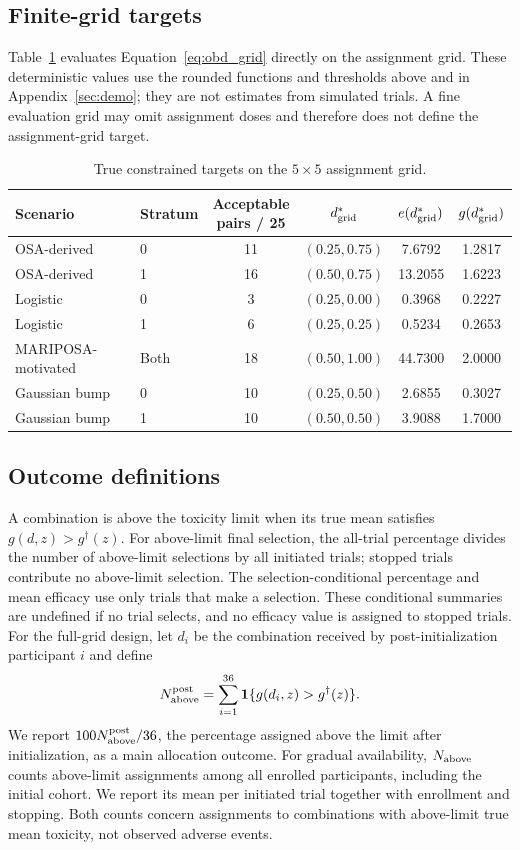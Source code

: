 \documentclass[11pt]{article}
\newcommand{\rev}[1]{{#1}}
\begin{document}
\subsection{Finite-grid targets}

Table~\ref{tab:grid_targets} evaluates Equation~\eqref{eq:obd_grid} directly on the assignment grid. These deterministic values use the rounded functions and thresholds above and in Appendix~\ref{sec:demo}; they are not estimates from simulated trials. \rev{A fine evaluation grid may omit assignment doses and therefore does not define the assignment-grid target.}

\begin{table}[htbp]
\centering\small
\caption{True constrained targets on the $5\times5$ assignment grid.}
\label{tab:grid_targets}
\begin{tabular}{@{}llcccc@{}}
\toprule
Scenario & Stratum & \shortstack{Acceptable\\pairs / 25} & $d^*_{\rm grid}$ & $e(d^*_{\rm grid})$ & $g(d^*_{\rm grid})$\\
\midrule
OSA-derived & 0 & 11 & $(0.25,0.75)$ & 7.6792 & 1.2817\\
OSA-derived & 1 & 16 & $(0.50,0.75)$ & 13.2055 & 1.6223\\
Logistic & 0 & 3 & $(0.25,0.00)$ & 0.3968 & 0.2227\\
Logistic & 1 & 6 & $(0.25,0.25)$ & 0.5234 & 0.2653\\
MARIPOSA-motivated & Both & 18 & $(0.50,1.00)$ & 44.7300 & 2.0000\\
Gaussian bump & 0 & 10 & $(0.25,0.50)$ & 2.6855 & 0.3027\\
Gaussian bump & 1 & 10 & $(0.50,0.50)$ & 3.9088 & 1.7000\\
\bottomrule
\end{tabular}
\end{table}

\subsection{Outcome definitions}\label{sec:outcomes}

A combination is above the toxicity limit when its true mean satisfies $g(d,z)>g^\dagger(z)$. \rev{For above-limit final selection, the all-trial percentage divides the number of above-limit selections by all initiated trials; stopped trials contribute no above-limit selection. The selection-conditional percentage and mean efficacy use only trials that make a selection. These conditional summaries are undefined if no trial selects, and no efficacy value is assigned to stopped trials.} For the full-grid design, let $d_i$ be the combination received by post-initialization participant $i$ and define
\[
N_{\rm above}^{\rm post}=\sum_{i=1}^{36}\mathbf 1\{g(d_i,z)>g^\dagger(z)\}.
\]
\rev{We report $100N_{\rm above}^{\rm post}/36$, the percentage assigned above the limit after initialization, as a main allocation outcome. For gradual availability, $N_{\rm above}$ counts above-limit assignments among all enrolled participants, including the initial cohort. We report its mean per initiated trial together with enrollment and stopping. Both counts concern assignments to combinations with above-limit true mean toxicity, not observed adverse events.}
\end{document}
